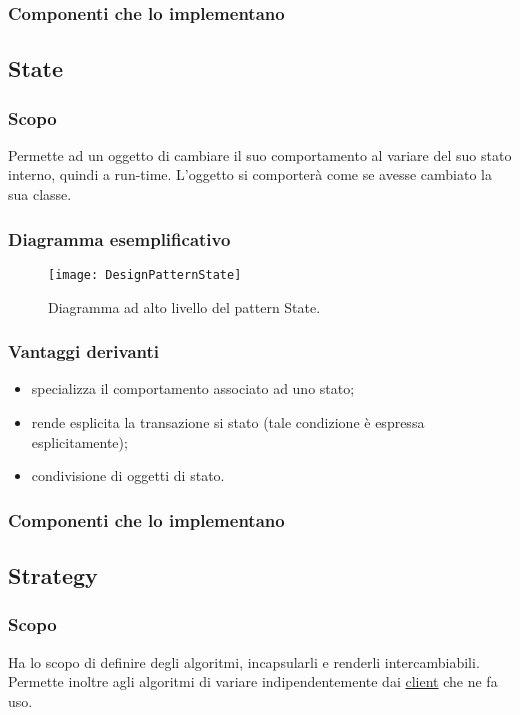 \subsubsection{Componenti che lo implementano}

\subsection{State}
\subsubsection{Scopo}
Permette ad un oggetto di cambiare il suo comportamento al variare del suo stato interno, quindi a run-time. L'oggetto si comporterà come se avesse cambiato la sua classe.
\subsubsection{Diagramma esemplificativo}
\begin{figure}[h]
\centering
\texttt{[image: DesignPatternState]}
\caption{Diagramma ad alto livello del pattern State.}\label{fig:state}
\end{figure}
\subsubsection{Vantaggi derivanti}
\begin{itemize}
\item specializza il comportamento associato ad uno stato;
\item rende esplicita la transazione si stato (tale condizione è espressa esplicitamente);
\item condivisione di oggetti di stato.
\end{itemize}

\subsubsection{Componenti che lo implementano}







\subsection{Strategy}
\subsubsection{Scopo}
Ha lo scopo di definire degli algoritmi, incapsularli e renderli intercambiabili. Permette inoltre agli algoritmi di variare indipendentemente dai \underline{client} che ne fa uso.
